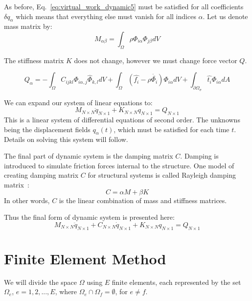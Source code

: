 \documentclass[en]{minipw} %
\begin{document}
As before, Eq.~\ref{eq:virtual_work_dynamic5} must be satisfied for all coefficients $\delta q_{\alpha}$ which means that everything else must vanish for all indices $\alpha$. Let us denote mass matrix by:
\begin{equation}
\label{eq:mass_matrix1}
M_{\alpha \beta} = \int_{\Omega} \rho \Phi_{i \alpha} \Phi_{j \beta} dV 
\end{equation}

The stiffness matrix $K$ does not change, however we must change force vector $Q$.

\begin{equation}
Q_{\alpha} = - \int_{\Omega} C_{ijkl} \Phi_{i \alpha,j} \hat{\Phi}_{k,l} dV + \int_{\Omega} (\hat{f_i} - \rho \ddot{\bar{\Phi_i}} ) \Phi_{i \alpha} dV + \int_{\partial \Omega_{\sigma}} \hat{t_i}\Phi_{i \alpha} dA
\end{equation}

We can expand our system of linear equations to:
\begin{equation}
\label{eq:fem_system}
M_{N \times N}\ddot{q}_{N \times 1} + K_{N \times N} q_{N \times 1} = Q_{N \times 1}
\end{equation}
This is a linear system of differential equations of second order. The unknowns being the displacement fields $q_{\alpha}(t)$, which must be satisfied for each time $t$. Details on solving this system will follow.

The final part of dynamic system is the damping matrix $C$. Damping is introduced to simulate friction forces internal to the structure. One model of creating damping matrix $C$ for structural systems is called Rayleigh damping matrix~\cite{damping}:
\begin{equation}
\label{eq:damping_matrix}
C = \alpha M + \beta K
\end{equation}
In other words, $C$ is the linear combination of mass and stiffness matrices.

Thus the final form of dynamic system is presented here:
\begin{equation}
\label{eq:fem_system_damping}
M_{N \times N}\ddot{q}_{N \times 1} + C_{N \times N}\dot{q}_{N \times 1} + K_{N \times N} q_{N \times 1} = Q_{N \times 1}
\end{equation}

\section{Finite Element Method}
We will divide the space $\Omega$ using $E$ finite elements, each represented by the set $\Omega_{e}$, $e = 1,2,...,E$, where $\Omega_{e} \cap \Omega_{f} = \emptyset$, for $e \neq f$.
\end{document}
